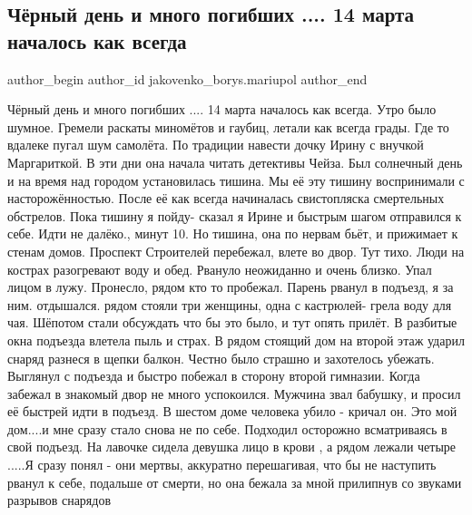  
 
 
 
 

\subsection{Чёрный день и много погибших .... 14 марта началось как всегда}
\label{sec:20_03_2023.fb.jakovenko_borys.mariupol.1.chernyj_den}

\ifcmt
 author_begin
   author_id jakovenko_borys.mariupol
 author_end
\fi

Чёрный день и много погибших .... 14 марта началось как всегда. Утро было
шумное. Гремели раскаты миномётов и гаубиц, летали как всегда грады. Где то
вдалеке пугал шум самолёта. По традиции навести дочку Ирину с внучкой
Маргариткой. В эти дни она начала читать детективы Чейза. Был солнечный день и
на время над городом установилась тишина. Мы её эту тишину воспринимали с
насторожённостью. После её как всегда начиналась свистопляска смертельных
обстрелов. Пока тишину я пойду- сказал я Ирине и быстрым шагом отправился к
себе. Идти не далёко., минут 10. Но тишина, она по нервам бьёт, и прижимает
к стенам домов. Проспект Строителей перебежал, влете во двор. Тут тихо. Люди на
кострах разогревают воду и обед. Рвануло неожиданно и очень близко. Упал лицом
в лужу. Пронесло, рядом кто то пробежал. Парень рванул в подъезд, я за ним.
отдышался.  рядом стояли три женщины, одна с кастрюлей- грела воду для чая.
Шёпотом стали обсуждать что бы это было, и тут опять прилёт. В разбитые окна
подъезда влетела пыль и страх.  В рядом стоящий дом на второй этаж ударил
снаряд разнеся в щепки балкон. Честно было страшно и захотелось убежать.
Выглянул с подъезда и быстро побежал в сторону второй гимназии. Когда забежал в
знакомый двор не много успокоился. Мужчина звал бабушку, и просил её быстрей
идти в подъезд. В шестом доме человека убило - кричал он.  Это мой дом....и мне
сразу стало снова не по себе. Подходил осторожно всматриваясь в свой подъезд.
На лавочке сидела девушка лицо в крови , а рядом лежали четыре .....Я сразу
понял - они мертвы, аккуратно перешагивая, что бы не наступить рванул к себе,
подальше от смерти, но она бежала за мной прилипнув со звуками разрывов
снарядов

